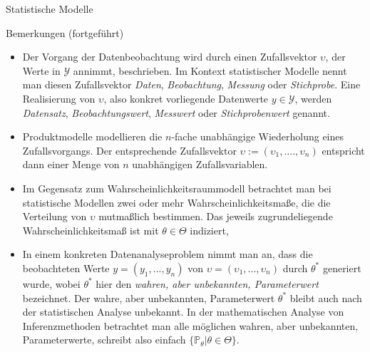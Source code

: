 \documentclass[
  8pt,
  ignorenonframetext,
]{beamer}
\newcommand{\ups}{\upsilon}
\begin{document}
\begin{frame}{Statistische Modelle}
\protect\hypertarget{statistische-modelle-1}{}
\footnotesize

Bemerkungen (fortgeführt)

\begin{itemize}
\item
  \justifying Der Vorgang der Datenbeobachtung wird durch einen
  Zufallsvektor \(\ups\), der Werte in \(\mathcal{Y}\) annimmt,
  beschrieben. Im Kontext statistischer Modelle nennt man diesen
  Zufallsvektor \emph{Daten}, \emph{Beobachtung}, \emph{Messung} oder
  \emph{Stichprobe}. Eine Realisierung von \(\ups\), also konkret
  vorliegende Datenwerte \(y \in \mathcal{Y}\), werden \emph{Datensatz},
  \emph{Beobachtungswert}, \emph{Messwert} oder \emph{Stichprobenwert}
  genannt.
\item
  \justifying Produktmodelle modellieren die \(n\)-fache unabhängige
  Wiederholung eines Zufallsvorgangs. Der entsprechende Zufallsvektor
  \(\ups := (\ups_1,....,\ups_n)\) entspricht dann einer Menge von \(n\)
  unabhängigen Zufallsvariablen.
\item
  \justifying Im Gegensatz zum Wahrscheinlichkeitsraummodell betrachtet
  man bei statistische Modellen zwei oder mehr Wahrscheinlichkeitsmaße,
  die die Verteilung von \(\ups\) mutmaßlich bestimmen. Das jeweils
  zugrundeliegende Wahrscheinlichkeitsmaß ist mit \(\theta \in \Theta\)
  indiziert,
\item
  \justifying In einem konkreten Datenanalyseproblem nimmt man an, dass
  die beobachteten Werte \(y = (y_1,...,y_n)\) von
  \(\ups = (\ups_1,...,\ups_n)\) durch \(\theta^*\) generiert wurde,
  wobei \(\theta^*\) hier den \emph{wahren, aber unbekannten,
  Parameterwert} bezeichnet. Der wahre, aber unbekannten, Parameterwert
  \(\theta^*\) bleibt auch nach der statistischen Analyse unbekannt. In
  der mathematischen Analyse von Inferenzmethoden betrachtet man alle
  möglichen wahren, aber unbekannten, Parameterwerte, schreibt also
  einfach \(\{\mathbb{P}_\theta |\theta \in \Theta\}\).
\end{itemize}
\end{frame}
\end{document}
